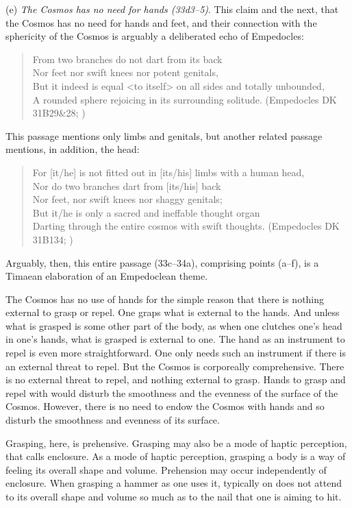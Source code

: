 (e) \emph{The Cosmos has no need for hands (33d3--5)}. This claim and the next, that the Cosmos has no need for hands and feet, and their connection with the sphericity of the Cosmos is arguably a deliberated echo of Empedocles:
\begin{verse}
	From two branches do not dart from its back\\
	Nor feet nor swift knees nor potent genitals,\\
	But it indeed is equal <to itself> on all sides and totally unbounded,\\
	A rounded sphere rejoicing in its surrounding solitude. (Empedocles DK 31B29\&28; \citealt[233]{Inwood:2001ve})
\end{verse}
This passage mentions only limbs and genitals, but another related passage mentions, in addition, the head:
\begin{verse}
	For [it/he] is not fitted out in [its/his] limbs with a human head,\\
	Nor do two branches dart from [its/his] back\\
	Nor feet, nor swift knees nor shaggy genitals;\\
	But it/he is only a sacred and ineffable thought organ\\
	Darting through the entire cosmos with swift thoughts. (Empedocles DK 31B134; \citealt[263]{Inwood:2001ve})
\end{verse}
Arguably, then, this entire passage (33c--34a), comprising points (a--f), is a Timaean elaboration of an Empedoclean theme.

The Cosmos has no use of hands for the simple reason that there is nothing external to grasp or repel. One graps what is external to the hands. And unless what is grasped is some other part of the body, as when one clutches one's head in one's hands, what is grasped is external to one. The hand as an instrument to repel is even more straightforward. One only needs such an instrument if there is an external threat to repel. But the Cosmos is corporeally comprehensive. There is no external threat to repel, and nothing external to grasp. Hands to grasp and repel with would disturb the smoothness and the evenness of the surface of the Cosmos. However, there is no need to endow the Cosmos with hands and so disturb the smoothness and evenness of its surface.

Grasping, here, is prehensive. Grasping may also be a mode of haptic perception, that \citet{Lederman:1987fr} calls enclosure. As a mode of haptic perception, grasping a body is a way of feeling its overall shape and volume. Prehension may occur independently of enclosure. When grasping a hammer as one uses it, typically on does not attend to its overall shape and volume so much as to the nail that one is aiming to hit. 

